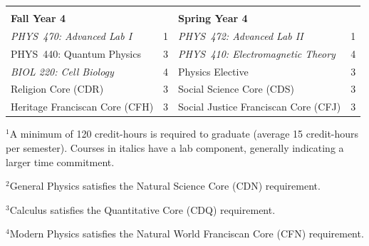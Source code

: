 \documentclass[12pt]{article}
\begin{document}
\begin{table}[h!]
\begin{center}
{\begin{tabular*}{0.9\textwidth}{@{\extracolsep{\fill}}lclc}
 & \\
{\Large \textbf{Fall Year 4}} & & {\Large \textbf{Spring Year 4}} & \\
\hline
{\em PHYS~470: Advanced Lab I} & 1 & {\em PHYS~472: Advanced Lab II}  & 1 \\
PHYS~440: Quantum Physics      & 3 & {\em PHYS~410: Electromagnetic Theory}  & 4 \\
{\em BIOL 220: Cell Biology}   & 4 & Physics Elective           & 3 \\
Religion Core (CDR)            & 3 & Social Science Core (CDS) & 3 \\
Heritage Franciscan Core (CFH) & 3 & Social Justice Franciscan Core (CFJ) & 3 \\
\hline
\end{tabular*}
}
\end{center}
\end{table}

\vspace*{-4mm}
\hspace{0.1in}$^{1}$A minimum of 120 credit-hours is required to
graduate (average 15 credit-hours per semester).  \hspace*{0.4in}Courses in italics have a lab
component, generally indicating a larger time commitment. 

\hspace{0.1in}$^{2}$General Physics satisfies the Natural Science Core (CDN) requirement.

\hspace{0.1in}$^{3}$Calculus satisfies the Quantitative Core (CDQ) requirement. 

\hspace{0.1in}$^{4}$Modern Physics satisfies the Natural World Franciscan Core
(CFN) requirement.
\end{document}
